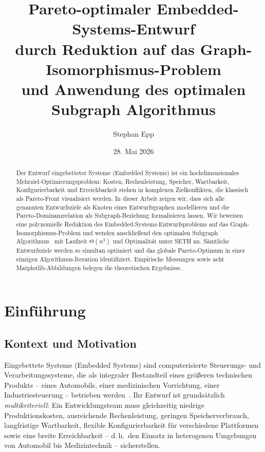 ﻿\documentclass[a4paper,12pt]{article}
\title{%
  \textbf{Pareto-optimaler Embedded-Systems-Entwurf}\\[0.4em]
  \large durch Reduktion auf das Graph-Iso\-mor\-phis\-mus-Problem\\
  und Anwendung des optimalen Subgraph Algorithmus
}
\author{Stephan Epp}
\date{28. Mai 2026}
\theoremstyle{definition}
\begin{document}
\maketitle

\begin{abstract}
Der Entwurf eingebetteter Systeme (Embedded Systems) ist ein hochdimensionales
Mehr\-ziel-Optimierungsproblem: Kosten, Rechenleistung, Speicher, Wartbarkeit,
Konfigurierbarkeit und Erreichbarkeit stehen in komplexen Zielkonflikten, die
klassisch als Pareto-Front visualisiert werden.
In dieser Arbeit zeigen wir, dass sich alle genannten Entwurfsziele als Knoten
eines Entwurfsgraphen modellieren und die Pareto-Dominanzrelation als
Subgraph-Beziehung formalisieren lassen.
Wir beweisen eine polynomielle Reduktion des Embedded-Systems-Entwurfsproblems
auf das Graph-Isomorphismus-Problem und wenden anschlie{\ss}end den optimalen
Subgraph Algorithmus~\cite{epp2026subgraph} mit Laufzeit $\Theta(n^3)$ und
Optimalit\"{a}t unter SETH an.
S\"{a}mtliche Entwurfsziele werden so simultan optimiert und das globale
Pareto-Optimum in einer einzigen Algorithmus-Iteration identifiziert.
Empirische Messungen sowie acht Matplotlib-Abbildungen belegen die theoretischen
Ergebnisse.
\end{abstract}

\tableofcontents
\newpage

\section{Einf\"{u}hrung}

\subsection{Kontext und Motivation}

Eingebettete Systeme (Embedded Systems) sind computerisierte Steuerungs- und
Verarbeitungssysteme, die als integraler Bestandteil eines gr\"{o}{\ss}eren technischen
Produkts -- eines Automobils, einer medizinischen Vorrichtung, einer
Industriesteuerung -- betrieben werden~\cite{barr2006programming}.
Ihr Entwurf ist grunds\"{a}tzlich \emph{multikriteriell}: Ein Entwicklungsteam muss
gleichzeitig niedrige Produktionskosten, ausreichende Rechenleistung, geringen
Speicherverbrauch, langfristige Wartbarkeit, flexible Konfigurierbarkeit f\"{u}r
verschiedene Plattformen sowie eine breite Erreichbarkeit -- d.\,h.\ den
Einsatz in heterogenen Umgebungen von Automobil bis Medizintechnik -- sicherstellen.
\end{document}
